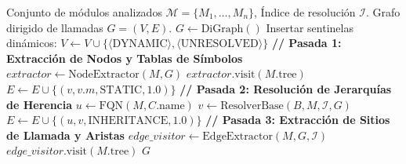 \documentclass[conference]{IEEEtran}
\begin{document}
\begin{algorithm}[t]
\caption{Construcción del Grafo de Llamadas en Tres Pasadas}
\label{alg:callgraph_construction}
\begin{algorithmic}[1]
\REQUIRE Conjunto de módulos analizados $\mathcal{M} = \{M_1, \dots, M_n\}$, Índice de resolución $\mathcal{I}$.
\ENSURE Grafo dirigido de llamadas $G = (V, E)$.
\STATE $G \leftarrow \text{DiGraph}()$
\STATE Insertar sentinelas dinámicos: $V \leftarrow V \cup \{\langle\text{DYNAMIC}\rangle, \langle\text{UNRESOLVED}\rangle\}$
\STATE \textbf{// Pasada 1: Extracción de Nodos y Tablas de Símbolos}
    \STATE $\mathit{extractor} \leftarrow \text{NodeExtractor}(M, G)$
    \STATE $\mathit{extractor}.\text{visit}(M.\text{tree})$
\ENDFOR
{}
            \STATE $E \leftarrow E \cup \{(v, v.m, \text{STATIC}, 1.0)\}$
        \ENDIF
    \ENDFOR
\ENDFOR
\STATE \textbf{// Pasada 2: Resolución de Jerarquías de Herencia}
        \STATE $u \leftarrow \text{FQN}(M, C.\text{name})$
            \STATE $v \leftarrow \text{ResolverBase}(B, M, \mathcal{I}, G)$
                \STATE $E \leftarrow E \cup \{(u, v, \text{INHERITANCE}, 1.0)\}$
            \ENDIF
        \ENDFOR
    \ENDFOR
\ENDFOR
\STATE \textbf{// Pasada 3: Extracción de Sitios de Llamada y Aristas}
    \STATE $\mathit{edge\_visitor} \leftarrow \text{EdgeExtractor}(M, G, \mathcal{I})$
    \STATE $\mathit{edge\_visitor}.\text{visit}(M.\text{tree})$
\ENDFOR
\RETURN $G$
\end{algorithmic}
\end{algorithm}
\end{document}
